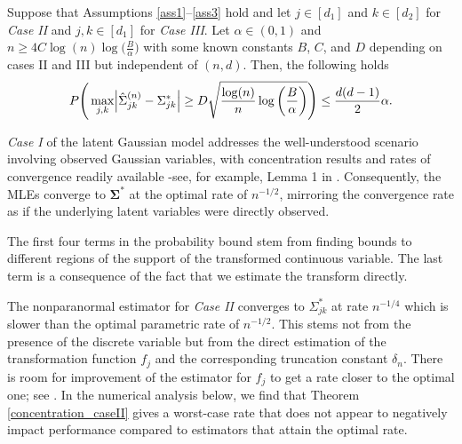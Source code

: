 \begin{change}
    \begin{theorem*}
        Suppose that Assumptions \ref{ass1}--\ref{ass3} hold and let $j \in [d_1]$ and $k \in [d_2]$ for  \textit{Case II} and $j,k \in [d_1]$ for \textit{Case III}. Let $\alpha \in (0,1)$ and \(n \geq 4 C \log(n) \log\Big(\frac{B}{\alpha}\Big)\) with some known constants $B$, $C$, and $D$ depending on cases II and III but independent of $(n,d)$. Then, the following holds
        \begin{equation*}
            P\Bigg(\max_{j,k}\abs{\hat{\Sigma}_{jk}^{(n)} - \Sigma_{jk}^{*}} \geq D\sqrt{\frac{\log(n)}{n} \log\bigg(\frac{B}{\alpha}\bigg)}\Bigg) \leq \frac{d(d-1)}{2}\alpha.
        \end{equation*}
    \end{theorem*}
    \textit{Case I} of the latent Gaussian model addresses the well-understood scenario involving observed Gaussian variables, with concentration results and rates of convergence readily available -see, for example, Lemma 1 in \citet{Ravikumar11}. Consequently, the MLEs converge to \(\mathbf{\Sigma}^{*}\) at the optimal rate of \(n^{-1/2}\), mirroring the convergence rate as if the underlying latent variables were directly observed.
\end{change}

\begin{change}
    The first four terms in the probability bound stem from finding bounds to different regions of the support of the transformed continuous variable. The last term is a consequence of the fact that we estimate the transform directly.

    The nonparanormal estimator for \textit{Case II} converges to \(\Sigma_{jk}^*\) at rate \(n^{-1/4}\) which is slower than the optimal parametric rate of \(n^{-1/2}\). This stems not from the presence of the discrete variable but from the direct estimation of the transformation function \({f}_j\) and the corresponding truncation constant \(\delta_n\). There is room for improvement of the estimator for \(f_j\) to get a rate closer to the optimal one; see \citep{Xue12}. In the numerical analysis below, we find that Theorem \ref{concentration_caseII} gives a worst-case rate that does not appear to negatively impact performance compared to estimators that attain the optimal rate.
\end{change}


